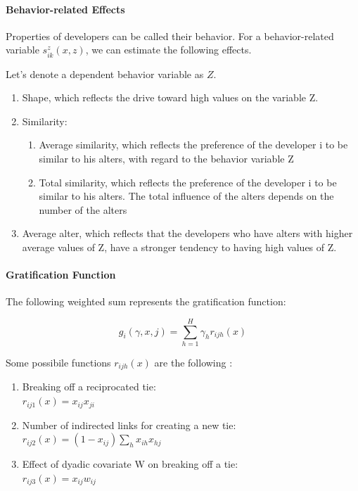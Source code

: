 \documentclass[12pt]{report}
\begin{document}
\paragraph{Behavior-related Effects\\}
Properties of developers can be called their behavior. For a behavior-related variable $s_{ik}^z(x,z)$, we can estimate the following effects.

Let's denote a dependent behavior variable as $Z$.
\begin{enumerate}
\item{Shape, which reflects the drive toward high values on the variable Z.}
\item{Similarity:}
\begin{enumerate}
\item{Average similarity, which reflects the preference of the developer i to be similar to his alters, with regard to the behavior variable Z}
\item{Total similarity, which reflects the preference of the developer i to be similar to his alters. The total influence of the alters depends on the number of the alters}
\end{enumerate}
\item{Average alter, which reflects that the developers who have alters with higher average values of Z, have a stronger tendency to having high values of Z.}
\end{enumerate}

\paragraph*{Gratification Function}
The following weighted sum represents the gratification function:

\begin{equation}
g_i(\gamma, x, j) = \sum_{h = 1}^{H} \gamma_h r_{ijh}(x)
\end{equation}

Some possibile functions $r_{ijh}(x)$ are the following \cite{Snijders2004}:
\begin{enumerate}
\item Breaking off a reciprocated tie:\\ 
$r_{ij1}(x) = x_{ij} x_{ji}$
\item Number of indirected links for creating a new tie:\\ $r_{ij2}(x) = (1 - x_{ij}) \sum_h x_{ih} x_{hj}$
\item Effect of dyadic covariate W on breaking off a tie:\\
$r_{ij3}(x) = x_{ij}w_{ij}$
\end{enumerate}
\end{document}
